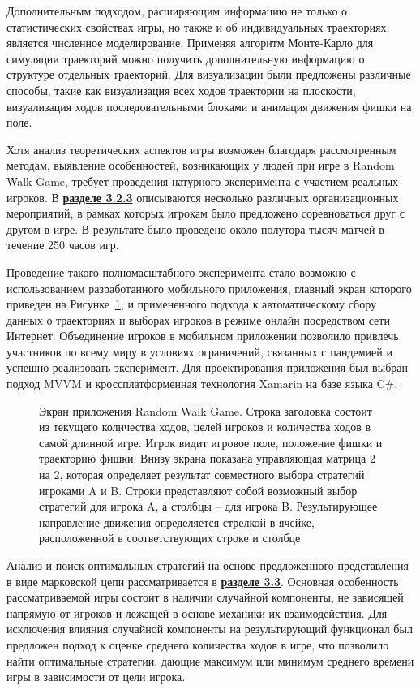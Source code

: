 Дополнительным подходом, расширяющим информацию не только о статистических свойствах игры, но также и об индивидуальных траекториях, является численное моделирование. Применяя алгоритм Монте-Карло для симуляции траекторий можно получить дополнительную информацию о структуре отдельных траекторий. Для визуализации были предложены различные способы, такие как визуализация всех ходов траектории на плоскости, визуализация ходов последовательными блоками и анимация движения фишки на поле. 

Хотя анализ теоретических аспектов игры возможен благодаря рассмотренным методам, выявление особенностей, возникающих у людей при игре в Random Walk Game, требует проведения натурного эксперимента с участием реальных игроков. В \underline{\textbf{разделе 3.2.3}} описываются несколько различных организационных мероприятий, в рамках которых игрокам было предложено соревноваться друг с другом в игре. В результате было проведено около полутора тысяч матчей в течение 250 часов игр.

Проведение такого полномасштабного эксперимента стало возможно с использованием разработанного мобильного приложения, главный экран которого приведен на Рисунке~\cref{fig:screenshot_game_field_ref}, и примененного подхода к автоматическому сбору данных о траекториях и выборах игроков в режиме онлайн посредством сети Интернет. Объединение игроков в мобильном приложении позволило привлечь участников по всему миру в условиях ограничений, связанных с пандемией и успешно реализовать эксперимент. Для проектирования приложения был выбран подход MVVM и кроссплатформенная технология Xamarin на базе языка C$\mathsf{\#}$.

\begin{figure}[ht]
    \caption{
        Экран приложения Random Walk Game. Строка заголовка состоит из текущего количества ходов, 
        целей игроков и количества ходов в самой длинной игре. Игрок видит игровое поле, положение фишки и траекторию фишки. Внизу экрана показана управляющая матрица $2$ на $2$, которая определяет результат совместного выбора стратегий игроками A и B. Строки представляют собой возможный выбор стратегий для игрока A, а столбцы -- для игрока B. Результирующее направление движения  определяется стрелкой в ячейке, расположенной в соответствующих строке и столбце
    }\label{fig:screenshot_game_field_ref}
\end{figure}

Анализ и поиск оптимальных стратегий на основе предложенного представления в виде марковской цепи рассматривается в \underline{\textbf{разделе 3.3}}. Основная особенность рассматриваемой игры состоит в наличии случайной компоненты, не зависящей напрямую от игроков и лежащей в основе механики их взаимодействия. Для исключения влияния случайной компоненты на результирующий функционал был предложен подход к оценке среднего количества ходов в игре, что позволило найти оптимальные стратегии, дающие максимум или минимум среднего времени игры в зависимости от цели игрока.

